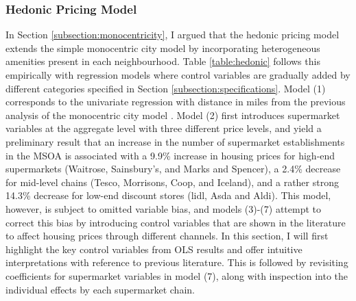 \documentclass{article}
\begin{document}
\subsubsection{Hedonic Pricing Model} \label{subsubsection:result:hedonic}
In Section \ref{subsection:monocentricity}, I argued that the hedonic pricing model extends the simple monocentric city model by incorporating heterogeneous amenities present in each neighbourhood. Table \ref{table:hedonic} follows this empirically with regression models where control variables are gradually added by different categories specified in Section \ref{subsection:specifications}. Model (1) corresponds to the univariate regression with distance in miles from the previous analysis of the monocentric city model . Model (2) first introduces supermarket variables at the aggregate level with three different price levels, and yield a preliminary result that an increase in the number of supermarket establishments in the MSOA is associated with a 9.9\% increase in housing prices for high-end supermarkets (Waitrose, Sainsbury's, and Marks and Spencer), a 2.4\% decrease for mid-level chains (Tesco, Morrisons, Coop, and Iceland), and a rather strong 14.3\% decrease for low-end discount stores (lidl, Asda and Aldi). This model, however, is subject to omitted variable bias, and models (3)-(7) attempt to correct this bias by introducing control variables that are shown in the literature to affect housing prices through different channels. In this section, I will first highlight the key control variables from OLS results and offer intuitive interpretations with reference to previous literature. This is followed by revisiting coefficients for supermarket variables in model (7), along with inspection into the individual effects by each supermarket chain.\\\\
\end{document}
